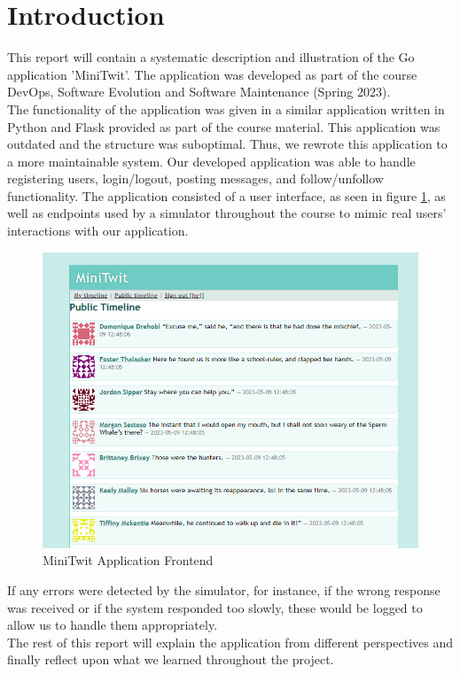 \section{Introduction}
This report will contain a systematic description and illustration of the Go application 
'MiniTwit'. The application was developed as part of the course 
DevOps, Software Evolution and Software Maintenance (Spring 2023). \\

The functionality of the application was
given in a similar application written in Python and Flask provided as part of the course material. This
application was outdated and the structure was suboptimal. Thus, we rewrote this application to a more 
maintainable system. Our developed application was able to handle registering users, login/logout, 
posting messages, and follow/unfollow functionality. The application consisted of a user interface, 
as seen in figure \ref{fig:minitwit_app}, as well as endpoints used by a simulator throughout the course to 
mimic real users' interactions with our application.

\begin{figure}[H]
    \centering
    \captionsetup{justification=centering,margin=1cm}
    \includegraphics[width=0.8\linewidth]{report/images/minitwit.png}
    \caption{MiniTwit Application Frontend}
    \label{fig:minitwit_app}
\end{figure}

If any errors were detected by the simulator, for instance, if the wrong response was received or if the system
responded too slowly, these would be logged to allow us to handle them appropriately.\\

The rest of this report will explain the application from different perspectives and finally reflect upon
what we learned throughout the project.

